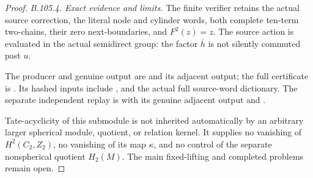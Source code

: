 \begin{proof}
\emph{B.105.4. Exact evidence and limits.}
The finite verifier retains the actual source correction, the
literal node and cylinder words, both complete ten-term
two-chains, their zero next-boundaries, and $F^2(z)=z$.
The source action is evaluated in the actual semidirect group:
the factor $\overline h$ is not silently commuted past $u$.

\begingroup\raggedright
The producer and genuine output are
and its adjacent output; the full certificate is
.
Its hashed inputs include
,
and the actual full source-word dictionary. The separate independent
replay is 
with its genuine adjacent output and
.\par
\endgroup

Tate-acyclicity of this submodule is not inherited automatically
by an arbitrary larger spherical module, quotient, or relation
kernel. It supplies no vanishing of $H^2(C_2,Z_2)$, no vanishing
of its map $\kappa$, and no control of the separate nonspherical
quotient $H_2(M)$. The main fixed-lifting and completed problems
remain open.
\end{proof}

